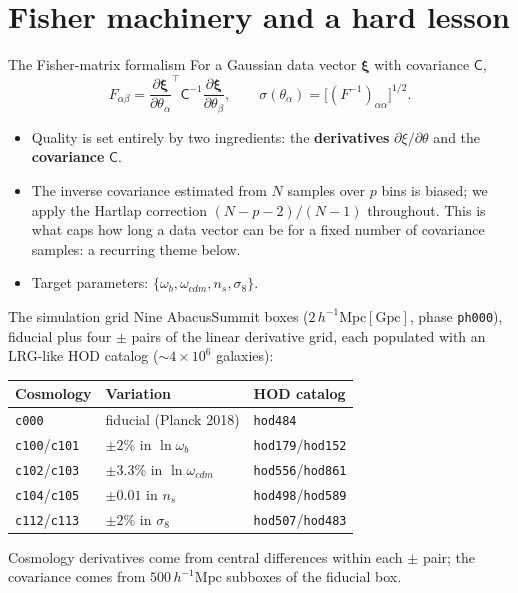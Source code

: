 \documentclass[aspectratio=169,11pt]{beamer}
\newcommand{\Mpch}{\,h^{-1}\mathrm{Mpc}}
\begin{document}
\section{Fisher machinery and a hard lesson}

\begin{frame}{The Fisher-matrix formalism}
For a Gaussian data vector $\boldsymbol\xi$ with covariance $\mathsf C$,
\[
F_{\alpha\beta} = \frac{\partial\boldsymbol\xi}{\partial\theta_\alpha}^{\!\top}
\mathsf C^{-1}
\frac{\partial\boldsymbol\xi}{\partial\theta_\beta},
\qquad
\sigma(\theta_\alpha) = \big[(F^{-1})_{\alpha\alpha}\big]^{1/2}.
\]
\begin{itemize}
\item Quality is set entirely by two ingredients: the \textbf{derivatives}
  $\partial\xi/\partial\theta$ and the \textbf{covariance} $\mathsf C$.
\item The inverse covariance estimated from $N$ samples over $p$ bins is biased;
  we apply the Hartlap correction $(N-p-2)/(N-1)$ throughout. This is what caps
  how long a data vector can be for a fixed number of covariance samples: a
  recurring theme below.
\item Target parameters: $\{\omega_b,\omega_{cdm},n_s,\sigma_8\}$.
\end{itemize}
\end{frame}

\begin{frame}{The simulation grid}
Nine AbacusSummit boxes ($2\Mpch[\mathrm{Gpc}]$, phase \texttt{ph000}), fiducial
plus four $\pm$ pairs of the linear derivative grid, each populated with an
LRG-like HOD catalog ($\sim\!4\times10^6$ galaxies):
\begin{center}
\small
\begin{tabular}{lll}
\toprule
Cosmology & Variation & HOD catalog \\
\midrule
\texttt{c000} & fiducial (Planck 2018) & \texttt{hod484} \\
\texttt{c100}/\texttt{c101} & $\pm2\%$ in $\ln\omega_b$ & \texttt{hod179}/\texttt{hod152} \\
\texttt{c102}/\texttt{c103} & $\pm3.3\%$ in $\ln\omega_{cdm}$ & \texttt{hod556}/\texttt{hod861} \\
\texttt{c104}/\texttt{c105} & $\pm0.01$ in $n_s$ & \texttt{hod498}/\texttt{hod589} \\
\texttt{c112}/\texttt{c113} & $\pm2\%$ in $\sigma_8$ & \texttt{hod507}/\texttt{hod483} \\
\bottomrule
\end{tabular}
\end{center}
\vspace{6pt}
Cosmology derivatives come from central differences within each $\pm$ pair; the
covariance comes from $500\Mpch$ subboxes of the fiducial box.
\end{frame}
\end{document}
